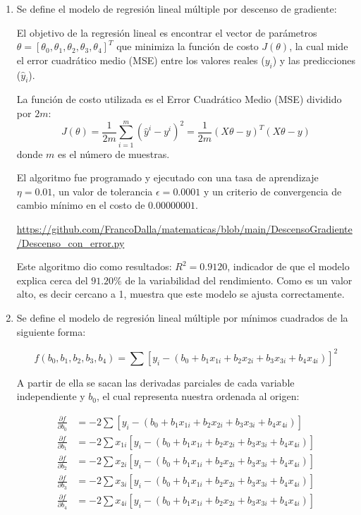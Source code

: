 \documentclass[spanish,12pt,a4paper]{article}
\begin{document}
	\begin{enumerate}[label=\alph*)]
		\item Se define el modelo de regresión lineal múltiple por descenso de gradiente:
		
		El objetivo de la regresión lineal es encontrar el vector de parámetros $\theta = [\theta_0, \theta_1, \theta_2, \theta_3, \theta_4]^T$ que minimiza la función de costo $J(\theta)$, la cual mide el error cuadrático medio (MSE) entre los valores reales ($y_i$) y las predicciones ($\hat{y}_i$).
		
		La función de costo utilizada es el Error Cuadrático Medio (MSE) dividido por $2m$:
		\begin{equation*}
			J(\theta) = \frac{1}{2m} \sum_{i=1}^{m} (\hat{y}^{i} - y^{i})^2 = \frac{1}{2m} (X\theta - y)^T (X\theta - y)
		\end{equation*}
		donde $m$ es el número de muestras.
		
		El algoritmo fue programado y ejecutado con una tasa de aprendizaje $\eta = 0.01$, un valor de tolerancia $\epsilon = 0.0001$ y un criterio de convergencia de cambio mínimo en el costo de $0.00000001$.
		
		\url{https://github.com/FrancoDalla/matematicas/blob/main/DescensoGradiente/Descenso_con_error.py}
		
		Este algoritmo dio como resultados: $R^2 = 0.9120$, indicador de que el modelo explica cerca del $91.20\%$ de la variabilidad del rendimiento. Como es un valor alto, es decir cercano a 1, muestra que este modelo se ajusta correctamente.
				
		\item Se define el modelo de regresión lineal múltiple por mínimos cuadrados de la siguiente forma:
		
		\[
			f(b_0, b_1, b_2, b_3, b_4) = \sum \left[y_i - (b_0 + b_1 x_{1i} + b_2 x_{2i} + b_3 x_{3i} + b_4 x_{4i})\right]^2
		\]
		
		A partir de ella se sacan las derivadas parciales de cada variable independiente y $b_0$, el cual representa nuestra ordenada al origen:
		
		\begin{align*}
			\frac{\partial f}{\partial b_0} &= -2 \sum \left[y_i - (b_0 + b_1 x_{1i} + b_2 x_{2i} + b_3 x_{3i} + b_4 x_{4i})\right] \\
			\frac{\partial f}{\partial b_1} &= -2 \sum x_{1i} \left[y_i - (b_0 + b_1 x_{1i} + b_2 x_{2i} + b_3 x_{3i} + b_4 x_{4i})\right] \\
			\frac{\partial f}{\partial b_2} &= -2 \sum x_{2i} \left[y_i - (b_0 + b_1 x_{1i} + b_2 x_{2i} + b_3 x_{3i} + b_4 x_{4i})\right] \\
			\frac{\partial f}{\partial b_3} &= -2 \sum x_{3i} \left[y_i - (b_0 + b_1 x_{1i} + b_2 x_{2i} + b_3 x_{3i} + b_4 x_{4i})\right] \\
			\frac{\partial f}{\partial b_4} &= -2 \sum x_{4i} \left[y_i - (b_0 + b_1 x_{1i} + b_2 x_{2i} + b_3 x_{3i} + b_4 x_{4i})\right]
		\end{align*}
		

\end{enumerate}
\end{document}

